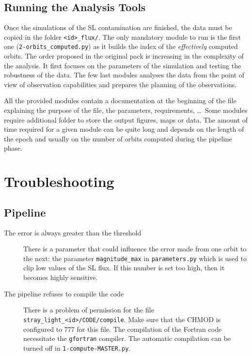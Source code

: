 \documentclass[a4paper,10pt]{article}
\begin{document}
\subsection{Running the Analysis Tools}
Once the simulations of the SL contamination are finished, the data must be copied in the folder \verb=<id>_flux/=. The only mandatory module to run is the first one (\verb=2-orbits_computed.py=) as it builds the index of the \emph{effectively} computed orbits. The order proposed in the original pack is increasing in the complexity of the analysis. It first focuses on the parameters of the simulation and testing the robustness of the data. The few last modules analyses the data from the point of view of observation capabilities and prepares the planning of the observations.

All the provided modules contain a documentation at the beginning of the file explaining the purpose of the file, the parameters, requirements, \dots\ Some modules require additional folder to store the output figures, maps or data. The amount of time required for a given module can be quite long and depends on the length of the epoch and usually on the number of orbits computed during the pipeline phase.

\section{Troubleshooting} \label{sec:Troubleshooting}
\subsection{Pipeline}
\begin{description}
 \item [The error is always greater than the threshold] There is a parameter that could influence the error made from one orbit to the next: the parameter \verb=magnitude_max= in \verb=parameters.py= which is used to clip low values of the SL flux. If this number is set too high, then it becomes highly sensitive.
 \item [The pipeline refuses to compile the code] There is a problem of permission for the file\\ \verb=stray_light_<id>/CODE/compile=. Make sure that the CHMOD is configured to 777 for this file. The compilation of the Fortran code necessitate the \verb=gfortran= compiler. The automatic compilation can be turned off in \verb=1-compute-MASTER.py=.
\end{description}
\end{document}
